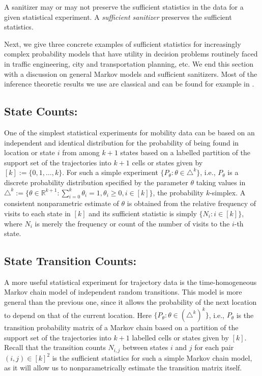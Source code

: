 \documentclass[times,twocolumn,final,authoryear]{elsarticle}
\begin{document}
 
A sanitizer may or may not preserve the sufficient statistics in the data for a given statistical experiment.
A {\em sufficient sanitizer} preserves the sufficient statistics. 

Next, we give three concrete examples of sufficient statistics for increasingly complex probability models that have utility in decision problems routinely faced in traffic engineering, city and transportation planning, etc.  
We end this section with a discussion on general Markov models and sufficient sanitizers.  Most of the inference theoretic results we use are classical and can be found for example in \cite{Billingsley:1961}.

\subsection{State Counts:}
One of the simplest statistical experiments for mobility data can be based on an independent and identical distribution for the probability of being found in location or state $i$ from among $k+1$ states based on a labelled partition of the support set of the trajectories into $k+1$ cells or states given by $[k] := \{0,1,\ldots,k\}$.  
For such a simple experiment $\{P_{\theta}: \theta \in \triangle^k \}$, i.e., $P_{\theta}$ is a discrete probability distribution specified by the 
parameter $\theta$ taking values in 
$\triangle^k := \{ \theta \in \mathbb{R}^{k+1} : \sum_{i=0}^k \theta_i = 1, \theta_i \geq 0, i \in [k] \}$, 
the probability $k$-simplex. 
A consistent nonparametric estimate of $\theta$ is obtained from the relative frequency of visits to each state in $[k]$ and its sufficient statistic is simply $\{N_i: i \in [k]\}$, where $N_i$ is merely the frequency or count of the number of visits to the $i$-th state.  

\subsection{State Transition Counts:}
A more useful statistical experiment for trajectory data is the time-homogeneous Markov chain model of independent random transitions. This model is more general than the previous one, since it allows the probability of the next location to depend on that of the current location.   
Here $\{P_{\theta}: \theta \in (\triangle^k)^k\}$, i.e., $P_{\theta}$ is the transition probability matrix of a Markov chain based on a partition of the support set of the trajectories into $k+1$ labelled cells or states given by $[k]$.  
Recall that the transition counts $N_{i,j}$ between states $i$ and $j$ for each pair $(i,j) \in [k]^2$ is the sufficient statistics for such a simple Markov chain model, as it will allow us to nonparametrically estimate the transition matrix itself.  
\end{document}
